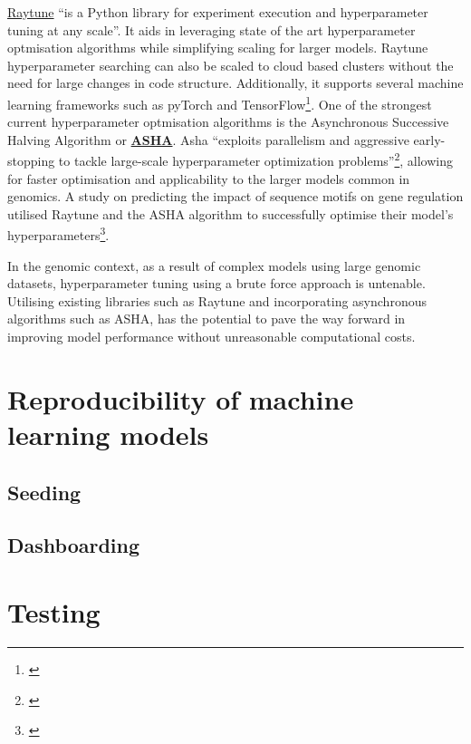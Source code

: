 \documentclass[
]{book}
\begin{document}
\href{https://docs.ray.io/en/latest/tune/index.html}{Raytune} ``is a Python library for experiment execution and hyperparameter tuning at any scale''. It aids in leveraging state of the art hyperparameter optmisation algorithms while simplifying scaling for larger models. Raytune hyperparameter searching can also be scaled to cloud based clusters without the need for large changes in code structure. Additionally, it supports several machine learning frameworks such as pyTorch and TensorFlow\footnote{\citet{liaw2018}}. One of the strongest current hyperparameter optmisation algorithms is the Asynchronous Successive Halving Algorithm or \textbf{\href{https://blog.ml.cmu.edu/2018/12/12/massively-parallel-hyperparameter-optimization/}{ASHA}}. Asha ``exploits parallelism and aggressive early-stopping to tackle large-scale hyperparameter optimization problems''\footnote{\citet{liam2018}}, allowing for faster optimisation and applicability to the larger models common in genomics. A study on predicting the impact of sequence motifs on gene regulation utilised Raytune and the ASHA algorithm to successfully optimise their model's hyperparameters\footnote{\citet{jacob2023}}.

In the genomic context, as a result of complex models using large genomic datasets, hyperparameter tuning using a brute force approach is untenable. Utilising existing libraries such as Raytune and incorporating asynchronous algorithms such as ASHA, has the potential to pave the way forward in improving model performance without unreasonable computational costs.

\chapter{Reproducibility of machine learning models}\label{reproducibility-of-machine-learning-models}

\section{Seeding}\label{seeding}

\section{Dashboarding}\label{dashboarding}

\chapter{Testing}\label{testing}
\end{document}
